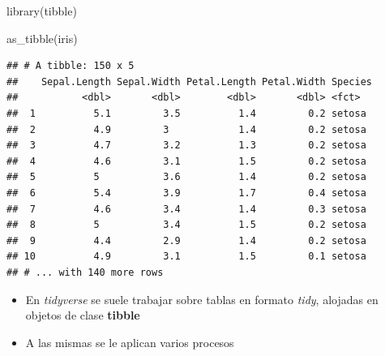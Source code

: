 \documentclass[
  10pt,
  ignorenonframetext,
]{beamer}
\newenvironment{Shaded}{\begin{snugshade}}{\end{snugshade}}
\newcommand{\FunctionTok}[1]{\textcolor[rgb]{0.00,0.00,0.00}{#1}}
\newcommand{\NormalTok}[1]{#1}
\providecommand{\tightlist}{%
  \setlength{\itemsep}{0pt}\setlength{\parskip}{0pt}}
\begin{document}
\begin{frame}[fragile]{}
\protect\hypertarget{section-1}{}

\scriptsize

\begin{Shaded}
\begin{Highlighting}[]
\FunctionTok{library}\NormalTok{(tibble)}

\FunctionTok{as\_tibble}\NormalTok{(iris)}
\end{Highlighting}
\end{Shaded}

\begin{verbatim}
## # A tibble: 150 x 5
##    Sepal.Length Sepal.Width Petal.Length Petal.Width Species
##           <dbl>       <dbl>        <dbl>       <dbl> <fct>  
##  1          5.1         3.5          1.4         0.2 setosa 
##  2          4.9         3            1.4         0.2 setosa 
##  3          4.7         3.2          1.3         0.2 setosa 
##  4          4.6         3.1          1.5         0.2 setosa 
##  5          5           3.6          1.4         0.2 setosa 
##  6          5.4         3.9          1.7         0.4 setosa 
##  7          4.6         3.4          1.4         0.3 setosa 
##  8          5           3.4          1.5         0.2 setosa 
##  9          4.4         2.9          1.4         0.2 setosa 
## 10          4.9         3.1          1.5         0.1 setosa 
## # ... with 140 more rows
\end{verbatim}

\normalsize

\begin{itemize}
\tightlist
\item
  En \emph{tidyverse} se suele trabajar sobre tablas en formato
  \emph{tidy}, alojadas en objetos de clase \textbf{tibble}
\item
  A las mismas se le aplican varios procesos
\end{itemize}
\end{frame}
\end{document}
